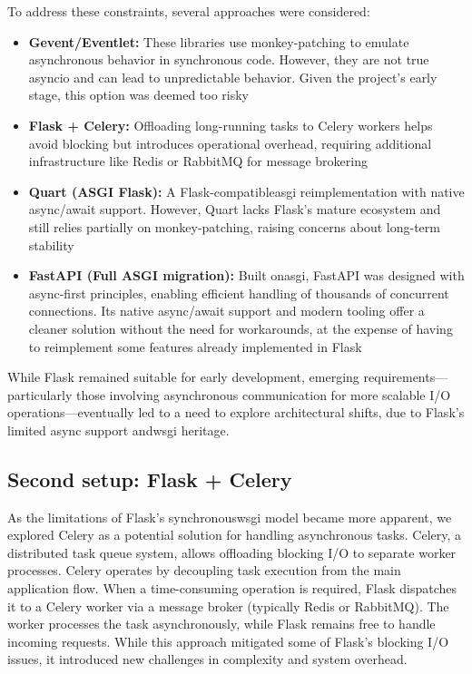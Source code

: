         To address these constraints, several approaches were considered:

        \begin{itemize}
            \item \textbf{Gevent/Eventlet:} These libraries use monkey-patching to emulate asynchronous behavior in synchronous code. However, 
            they are not true asyncio and can lead to unpredictable behavior. Given the project's early stage, this option was deemed too risky

            \item \textbf{Flask + Celery:} Offloading long-running tasks to Celery workers helps avoid blocking but introduces operational overhead, 
            requiring additional infrastructure like Redis or RabbitMQ for message brokering

            \item \textbf{Quart (ASGI Flask):} A Flask-compatible\ac{asgi} reimplementation with native async/await support. However, Quart lacks 
            Flask's mature ecosystem and still relies partially on monkey-patching, raising concerns about long-term stability

            \item \textbf{FastAPI (Full ASGI migration):} Built on\ac{asgi}, FastAPI was designed with async-first principles, enabling efficient handling 
            of thousands of concurrent connections. Its native async/await support and modern tooling offer a cleaner solution without the need 
            for workarounds, at the expense of having to reimplement some features already implemented in Flask
        \end{itemize}

        While Flask remained suitable for early development, emerging requirements—particularly those involving asynchronous 
        communication for more scalable I/O operations—eventually led to a need to explore architectural shifts, due to 
        Flask's limited async support and\ac{wsgi} heritage. 
    
    \subsection{Second setup: Flask + Celery}

        As the limitations of Flask's synchronous\ac{wsgi} model became more apparent, we explored Celery as a potential solution for handling 
        asynchronous tasks. Celery, a distributed task queue system, allows offloading blocking I/O to separate worker processes. 
        Celery operates by decoupling task execution from the main application flow. When a time-consuming operation is required, Flask 
        dispatches it to a Celery worker via a message broker (typically Redis or RabbitMQ). The worker processes the task asynchronously, 
        while Flask remains free to handle incoming requests. While this approach mitigated some of Flask's blocking I/O issues, it 
        introduced new challenges in complexity and system overhead.

